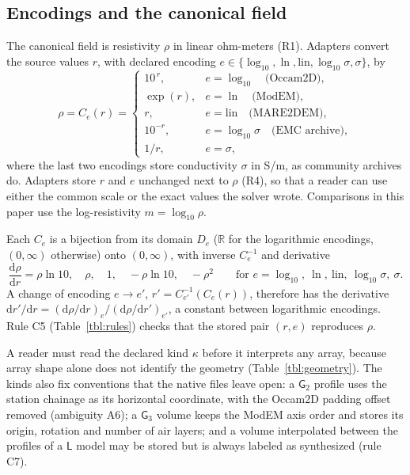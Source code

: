 \documentclass[manuscript]{geophysics}
\newcommand{\R}{\mathbb{R}}
\newcommand{\Gtwo}{\mathsf{G}_{2}}
\newcommand{\Gthree}{\mathsf{G}_{3}}
\newcommand{\Lset}{\mathsf{L}}
\begin{document}
\subsection{Encodings and the canonical field}

The canonical field is resistivity $\rho$ in linear ohm-meters (R1).
Adapters convert the source values $r$, with declared encoding
$e \in \{\log_{10}, \ln, \mathrm{lin}, \log_{10}\sigma, \sigma\}$, by
\begin{equation}
\rho = C_e(r) =
\begin{cases}
10^{\,r}, & e = \log_{10} \quad \text{(Occam2D)},\\
\exp(r),  & e = \ln       \quad \text{(ModEM)},\\
r,        & e = \mathrm{lin} \quad \text{(MARE2DEM)},\\
10^{-r},  & e = \log_{10}\sigma \quad \text{(EMC archive)},\\
1/r,      & e = \sigma,
\end{cases}
\label{eq:canonical}
\end{equation}
where the last two encodings store conductivity $\sigma$ in S/m, as
community archives do. Adapters store $r$ and $e$ unchanged next to
$\rho$ (R4), so that a reader can use either the common scale or the
exact values the solver wrote. Comparisons in this paper
use the log-resistivity $m = \log_{10}\rho$.

Each $C_e$ is a bijection from its domain $D_e$ ($\R$ for the
logarithmic encodings, $(0, \infty)$ otherwise) onto $(0, \infty)$,
with inverse $C_e^{-1}$ and derivative
\begin{equation}
\frac{\mathrm{d}\rho}{\mathrm{d}r} =
\rho\ln 10,\quad \rho,\quad 1,\quad -\rho\ln 10,\quad -\rho^{2}
\qquad \text{for } e = \log_{10},\ \ln,\ \mathrm{lin},\
\log_{10}\sigma,\ \sigma .
\label{eq:jacobian}
\end{equation}
A change of encoding $e \to e'$, $r' = C_{e'}^{-1}\!\left(C_e(r)\right)$,
therefore has the derivative
$\mathrm{d}r'/\mathrm{d}r =
(\mathrm{d}\rho/\mathrm{d}r)_{e} / (\mathrm{d}\rho/\mathrm{d}r')_{e'}$,
a constant between logarithmic encodings. Rule C5
(Table~\ref{tbl:rules}) checks that the stored pair $(r, e)$
reproduces $\rho$.

A reader must read the declared kind $\kappa$ before it interprets
any array, because array shape alone does not identify the geometry
(Table~\ref{tbl:geometry}). The kinds also fix conventions that the
native files leave open: a $\Gtwo$ profile uses the station chainage
as its horizontal coordinate, with the Occam2D padding offset removed
(ambiguity A6); a $\Gthree$ volume keeps the ModEM axis order and
stores its origin, rotation and number of air layers; and a volume
interpolated between the profiles of a $\Lset$ model may be stored but
is always labeled as synthesized (rule C7).
\end{document}
